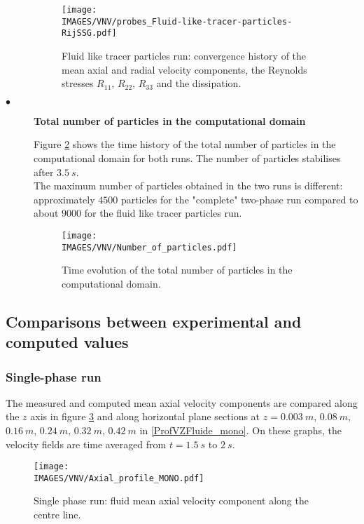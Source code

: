 \begin{description}
         \begin{figure}[H]
            \centerline{\texttt{[image: \\IMAGES/VNV/probes\_Fluid-like-tracer-particles-RijSSG.pdf]}}
            \caption{Fluid like tracer particles run: convergence history of the mean axial and radial velocity components, the Reynolds stresses $R_{11}$, $R_{22}$, $R_{33}$ and the dissipation.}
            \label{Histo_Lang} 
         \end{figure}


   \item[$\bullet$] \textbf{Total number of particles in the computational domain}

         Figure \ref{nbpart} shows the time history of the total number of particles in the computational domain for both runs. The number of particles stabilises after $3.5~s$. \\ The maximum number of particles obtained in the two runs is different: approximately $4500$ particles for the "complete" two-phase run compared to about $9000$ for the fluid like tracer particles run.\\

         \begin{figure}[H]
            \centerline{\texttt{[image: \\IMAGES/VNV/Number\_of\_particles.pdf]}}
            \caption{Time evolution of the total number of particles in the computational domain.}
            \label{nbpart}
         \end{figure}

\end{description}

\clearpage

\subsection{Comparisons between experimental and computed values}

\subsubsection{Single-phase run}

The measured and computed mean axial velocity components are compared along the $z$ axis in figure \ref{AxeFluide_mono} and along horizontal plane sections at $z = 0.003~m$, $0.08~m$, $0.16~m$, $0.24~m$, $0.32~m$, $0.42~m$ in \ref{ProfVZFluide_mono}. On these graphs, the velocity fields are time averaged from $t=1.5~s$ to $2~s$.

\begin{figure}[H]
   \centerline{\texttt{[image: \\IMAGES/VNV/Axial\_profile\_MONO.pdf]}}
   \caption{Single phase run: fluid mean axial velocity component along the centre line.}
   \label{AxeFluide_mono}
\end{figure}

